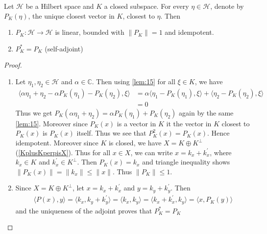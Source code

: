 \begin{theorem}
  \label{OrthogoalProjectionsAreSelfAdjointContractions}
  Let $\mathcal{H}$ be a Hilbert space and $K$ a closed subspace. For every
  $\eta \in \mathcal{H}$, denote by $P_K(\eta)$, the unique closest vector in
  $K$, closest to $\eta$. Then
  \begin{enumerate}[label=(\arabic*)]
    \item $P_K: \mathcal{H} \to \mathcal{H}$ is linear, bounded with $\|P_K\| =
      1$ and idempotent.
    \item $P_K^* = P_K$ (self-adjoint)
  \end{enumerate}
\end{theorem}
\begin{proof}
  \begin{enumerate}[label=(\arabic*)]
    \item Let $\eta_1, \eta_2 \in \mathcal{H}$ and $\alpha \in \mathbb{C}$.
      Then using \autoref{lem:15} for all $\xi \in K$, we have
      \begin{align*}
        \langle  \alpha \eta_1
        +\eta_2 - \alpha P_K( \eta_1) - P_K(\eta_2) , \xi \rangle &=
        \alpha \langle \eta_1 - P_K(\eta_1) , \xi  \rangle + \langle
        \eta_2 - P_K(\eta_2) , \xi  \rangle  \\
        &= 0
      \end{align*}
      Thus we get $P_K(\alpha \eta_1 + \eta_2) = \alpha P_K(\eta_1) +
      P_K(\eta_2)$ again by the same \autoref{lem:15}. Moreover since
      $P_K(x)$ is a vector in $K$ it the vector in $K$ closest to
      $P_K(x)$ is $P_K(x)$ itself. Thus we see that $P^2_K(x) =
      P_K(x)$. Hence idempotent. Moreover since $K$ is closed, we
      have $X = K \oplus K^\perp$ (\autoref{KplusKperpisX}). Thus for
      all $x \in X$, we can
      write $ x = k_x + k^\prime_x$, where $ k_x \in K$ and $
      k^\prime_x \in K^\perp$. Then $P_K(x) = k_x$ and triangle
      inequality shows $ \|P_K(x)\| = \|k_x\| \le \|x\|$. Thus $\|P_K\| \le 1$.

    \item Since $X = K \oplus K^\perp$, let $x = k_x + k^\prime_x$
      and $y = k_y + k^\prime_y$. Then
      \begin{align*}
        \langle P(x) ,  y \rangle = \langle k_x , k_y + k^\prime_y
        \rangle = \langle k_x , k_y \rangle = \langle k_x  +
        k^\prime_x , k_y \rangle = \langle x , P_K(y) \rangle
      \end{align*}
      and the uniqueness of the adjoint proves that $P_K^* = P_K$
  \end{enumerate}
\end{proof}

